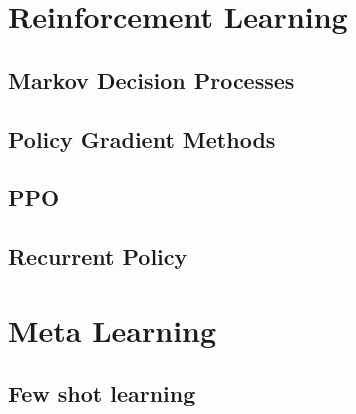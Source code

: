 \section{Reinforcement Learning}
\subsection{Markov Decision Processes}
\subsection{Policy Gradient Methods}
\subsection{PPO}
\subsection{Recurrent Policy}
\section{Meta Learning}
\subsection{Few shot learning}
